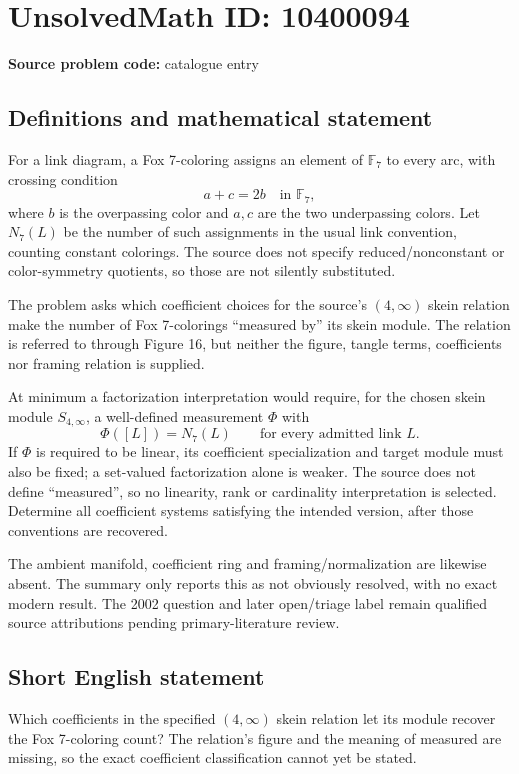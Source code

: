 \documentclass[11pt]{article}
\begin{document}
\section*{UnsolvedMath ID: 10400094}
\textbf{Source problem code:} catalogue entry
\subsection{Definitions and mathematical statement}
For a link diagram, a Fox 7-coloring assigns an element of \(\mathbb F_7\) to every arc, with crossing condition
\[
 a+c=2b\quad\text{in }\mathbb F_7,
\]
where \(b\) is the overpassing color and \(a,c\) are the two underpassing colors. Let \(N_7(L)\) be the number of such assignments in the usual link convention, counting constant colorings. The source does not specify reduced/nonconstant or color-symmetry quotients, so those are not silently substituted.

The problem asks which coefficient choices for the source's \((4,\infty)\) skein relation make the number of Fox 7-colorings ``measured by'' its skein module. The relation is referred to through Figure 16, but neither the figure, tangle terms, coefficients nor framing relation is supplied.

At minimum a factorization interpretation would require, for the chosen skein module \(S_{4,\infty}\), a well-defined measurement \(\Phi\) with
\[
 \Phi([L])=N_7(L)\qquad\text{for every admitted link }L.
\]
If \(\Phi\) is required to be linear, its coefficient specialization and target module must also be fixed; a set-valued factorization alone is weaker. The source does not define ``measured'', so no linearity, rank or cardinality interpretation is selected. Determine all coefficient systems satisfying the intended version, after those conventions are recovered.

The ambient manifold, coefficient ring and framing/normalization are likewise absent. The summary only reports this as not obviously resolved, with no exact modern result. The 2002 question and later open/triage label remain qualified source attributions pending primary-literature review.
\subsection{Short English statement}
Which coefficients in the specified \((4,\infty)\) skein relation let its module recover the Fox 7-coloring count? The relation's figure and the meaning of measured are missing, so the exact coefficient classification cannot yet be stated.
\end{document}
